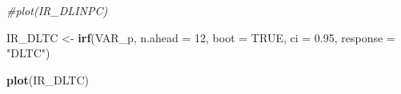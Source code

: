 \documentclass[
]{book}
\newenvironment{Shaded}{\begin{snugshade}}{\end{snugshade}}
\newcommand{\AttributeTok}[1]{\textcolor[rgb]{0.13,0.29,0.53}{#1}}
\newcommand{\CommentTok}[1]{\textcolor[rgb]{0.56,0.35,0.01}{\textit{#1}}}
\newcommand{\ConstantTok}[1]{\textcolor[rgb]{0.56,0.35,0.01}{#1}}
\newcommand{\DecValTok}[1]{\textcolor[rgb]{0.00,0.00,0.81}{#1}}
\newcommand{\FloatTok}[1]{\textcolor[rgb]{0.00,0.00,0.81}{#1}}
\newcommand{\FunctionTok}[1]{\textcolor[rgb]{0.13,0.29,0.53}{\textbf{#1}}}
\newcommand{\NormalTok}[1]{#1}
\newcommand{\OtherTok}[1]{\textcolor[rgb]{0.56,0.35,0.01}{#1}}
\newcommand{\StringTok}[1]{\textcolor[rgb]{0.31,0.60,0.02}{#1}}
\begin{document}
\begin{Shaded}
\begin{Highlighting}[]
\CommentTok{\#plot(IR\_DLINPC)}
\end{Highlighting}
\end{Shaded}

\begin{Shaded}
\begin{Highlighting}[]
\NormalTok{IR\_DLTC }\OtherTok{\textless{}{-}} \FunctionTok{irf}\NormalTok{(VAR\_p, }\AttributeTok{n.ahead =} \DecValTok{12}\NormalTok{, }\AttributeTok{boot =} \ConstantTok{TRUE}\NormalTok{, }
               \AttributeTok{ci =} \FloatTok{0.95}\NormalTok{, }\AttributeTok{response =} \StringTok{"DLTC"}\NormalTok{)}

\FunctionTok{plot}\NormalTok{(IR\_DLTC)}
\end{Highlighting}
\end{Shaded}
\end{document}
